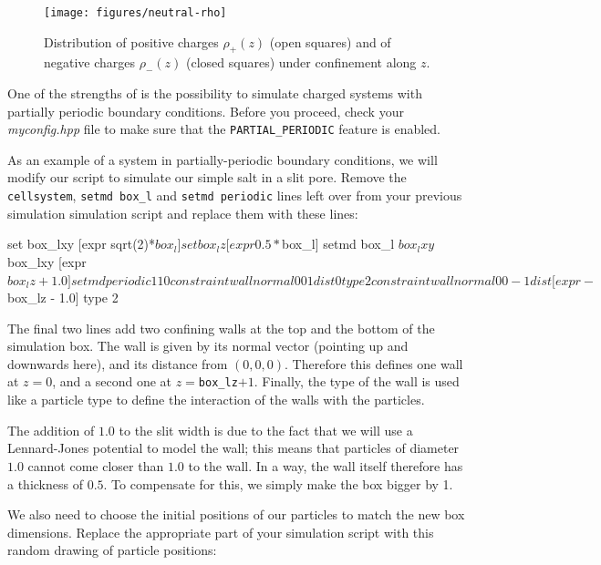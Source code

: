 \documentclass[
a4paper,                        %
11pt,                           %
twoside,                        %
footsepline,                    %
headsepline,                    %
headexclude,                    %
footexclude,                    %
pagesize,                       %
]{scrartcl}
\begin{document}
\begin{figure}[h]
  \centering
  \texttt{[image: figures/neutral-rho]}
  \caption{Distribution of positive charges $\rho_+(z)$ (open squares)
    and of negative charges $\rho_-(z)$ (closed squares) under
    confinement along $z$.}
  \label{fig:neutralrho}
\end{figure}

One of the strengths of \es{} is the possibility to simulate charged
systems with partially periodic boundary conditions.
Before you proceed, check your \emph{myconfig.hpp} file to make
sure that the \verb|PARTIAL_PERIODIC| feature is enabled.

As an example of a system in partially-periodic boundary conditions,
we will modify our script to simulate our simple salt in a slit pore.
Remove the \verb|cellsystem|, \verb|setmd box_l| and \verb|setmd periodic| lines left
over from your previous simulation simulation script and replace them
with these lines:

\begin{tclcode}
  set box_lxy [expr sqrt(2)*$box_l]
  set box_lz  [expr 0.5*$box_l]
  setmd box_l $box_lxy $box_lxy [expr $box_lz + 1.0]
  setmd periodic 1 1 0
  constraint wall normal 0 0  1 dist 0 type 2
  constraint wall normal 0 0 -1 dist [expr -$box_lz - 1.0] type 2
\end{tclcode}

The final two lines add two confining walls at the top
and the bottom of the simulation box. The wall is given by its normal
vector (pointing up and downwards here), and its distance from
$(0,0,0)$. Therefore this defines one wall at $z=0$, and a second
one at $z=$\verb|box_lz|$+1$. Finally, the type of the wall is used like a
particle type to define the interaction of the walls with the particles.

The addition of $1.0$ to the slit width is due to the fact that we will
use a Lennard-Jones potential to model the wall; this means that
particles of diameter $1.0$ cannot come closer than $1.0$ to the wall. In a
way, the wall itself therefore has a thickness of $0.5$. To compensate
for this, we simply make the box bigger by 1.

We also need to choose the initial positions of our particles to match
the new box dimensions. Replace the appropriate part of your
simulation script with this random drawing of particle positions:

\end{document}
